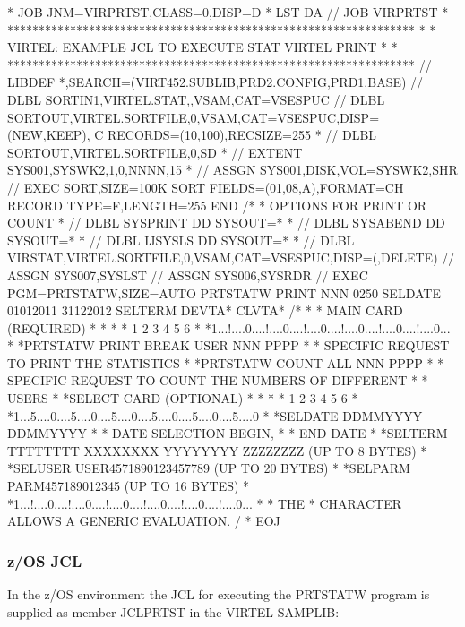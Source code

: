 \documentclass[letterpaper,10pt,english]{sphinxmanual}
\begin{document}
\begin{sphinxVerbatim}[commandchars=\\\{\}]
* \PYGZdl{}\PYGZdl{} JOB JNM=VIRPRTST,CLASS=0,DISP=D
* \PYGZdl{}\PYGZdl{} LST DA
// JOB VIRPRTST
* *****************************************************************
* * VIRTEL: EXAMPLE JCL TO EXECUTE STAT VIRTEL PRINT *
* *****************************************************************
// LIBDEF *,SEARCH=(VIRT452.SUBLIB,PRD2.CONFIG,PRD1.BASE)
// DLBL SORTIN1,\PYGZsq{}VIRTEL.STAT\PYGZsq{},,VSAM,CAT=VSESPUC
// DLBL SORTOUT,\PYGZsq{}\PYGZpc{}VIRTEL.SORTFILE\PYGZsq{},0,VSAM,CAT=VSESPUC,DISP=(NEW,KEEP), C
RECORDS=(10,100),RECSIZE=255
* // DLBL SORTOUT,\PYGZsq{}VIRTEL.SORTFILE\PYGZsq{},0,SD
* // EXTENT SYS001,SYSWK2,1,0,NNNN,15
* // ASSGN SYS001,DISK,VOL=SYSWK2,SHR
// EXEC SORT,SIZE=100K
SORT FIELDS=(01,08,A),FORMAT=CH
RECORD TYPE=F,LENGTH=255
END
/*
* OPTIONS FOR PRINT OR COUNT
* // DLBL SYSPRINT DD SYSOUT=*
* // DLBL SYSABEND DD SYSOUT=*
* // DLBL IJSYSLS DD SYSOUT=*
*
// DLBL VIRSTAT,\PYGZsq{}\PYGZpc{}VIRTEL.SORTFILE\PYGZsq{},0,VSAM,CAT=VSESPUC,DISP=(,DELETE)
// ASSGN SYS007,SYSLST
// ASSGN SYS006,SYSRDR
// EXEC PGM=PRTSTATW,SIZE=AUTO
PRTSTATW PRINT NNN 0250
SELDATE 01012011 31122012
SELTERM DEVTA* CLVTA*
/*
* * MAIN CARD (REQUIRED)
* * \PYGZhy{}\PYGZhy{}\PYGZhy{}\PYGZhy{}\PYGZhy{}\PYGZhy{}\PYGZhy{}\PYGZhy{}\PYGZhy{}
* * 1 2 3 4 5 6
* *1...!....0....!....0....!....0....!....0....!....0....!....0...
* *PRTSTATW PRINT BREAK USER NNN PPPP
* * SPECIFIC REQUEST TO PRINT THE STATISTICS
* *PRTSTATW COUNT \PYGZdl{}ALL\PYGZdl{} NNN PPPP
* * SPECIFIC REQUEST TO COUNT THE NUMBERS OF DIFFERENT
* * USERS
* *SELECT CARD (OPTIONAL)
* * \PYGZhy{}\PYGZhy{}\PYGZhy{}\PYGZhy{}\PYGZhy{}\PYGZhy{}\PYGZhy{}\PYGZhy{}\PYGZhy{}\PYGZhy{}\PYGZhy{}
* * 1 2 3 4 5 6
* *1...5....0....5....0....5....0....5....0....5....0....5....0
* *SELDATE DDMMYYYY DDMMYYYY
* * DATE SELECTION BEGIN,
* * END DATE
* *SELTERM TTTTTTTT XXXXXXXX YYYYYYYY ZZZZZZZZ (UP TO 8 BYTES)
* *SELUSER USER4571890123457789 (UP TO 20 BYTES)
* *SELPARM PARM457189012345 (UP TO 16 BYTES)
* *1...!....0....!....0....!....0....!....0....!....0....!....0...
* * THE \PYGZsq{}*\PYGZsq{} CHARACTER ALLOWS A GENERIC EVALUATION.
/\PYGZam{}
* \PYGZdl{}\PYGZdl{} EOJ
\end{sphinxVerbatim}

\sphinxAtStartPar
{}


\subsubsection{z/OS JCL}
\label{\detokenize{audit_operations_ and_performance:z-os-jcl}}
\sphinxAtStartPar
In the z/OS environment the JCL for executing the PRTSTATW program is supplied as member JCLPRTST in the VIRTEL SAMPLIB:
\end{document}

